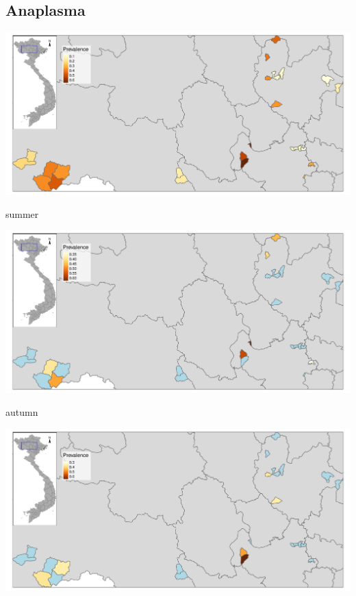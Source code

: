 \subsection{Anaplasma}
\begin{frame}
\begin{center}
\includegraphics[width=1\textwidth]{map03.pdf}
\end{center}
\end{frame}

\begin{frame}
summer\\
\begin{center}
\includegraphics[width=1\textwidth]{map03_summer.pdf}
\end{center}
\end{frame}


\begin{frame}
autumn\\
\begin{center}
\includegraphics[width=1\textwidth]{map03_autumn.pdf}
\end{center}
\end{frame}

